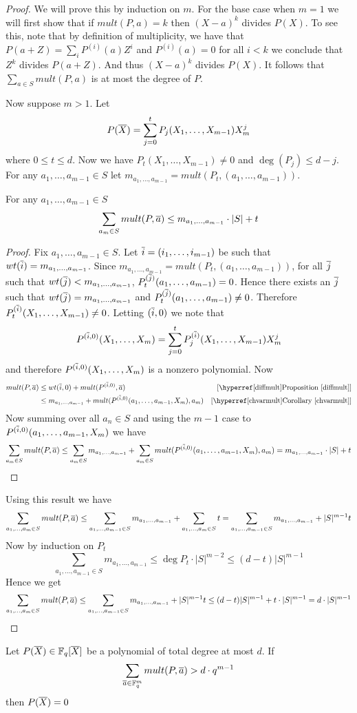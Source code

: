 \begin{proof}
	We will prove this by induction on $m$. For the base case when $m=1$ we will first show that if $mult(P,a)=k$ then $(X-a)^k$ divides $P(X)$. To see this, note that by definition of multiplicity, we have that $P(a+Z)=\sum\limits_{i}P^{(i)}(a)Z^{i}$ and $P^{(i)}(a)=0$ for all $i<k$ we conclude that $Z^k$ divides $P(a+Z)$. And thus $(X-a)^k$ divides $P(X)$. It follows that $\sum\limits_{a\in S} mult(P,a)$ is at most the degree of $P$. 
	
	Now suppose $m>1$. Let $$P(\overline{X})=\sum_{j=0}^t P_j(X_1,\dots, X_{m-1})X^j_m$$where $0\leq t\leq d$. Now we have $P_t(X_1,\dots, X_{m-1})\neq 0$ and $\deg(P_j)\leq d-j$. For any $a_1,\dots, a_{m-1}\in S$ let $m_{a_1,\dots, a_{m-1}}=mult(P_t,(a_1,\dots, a_{m-1}))$. 
	\begin{claim}
		For any $a_1,\dots, a_{m-1}\in S$ $$\sum_{a_m\in S}mult(P, \overline{a})\leq m_{a_1,\dots,a_{m-1}}\cdot |S|+t$$
	\end{claim}
	\begin{proof}
		Fix $a_1,\dots, a_{m-1}\in S$. Let $\overline{i}=(i_1,\dots, i_{m-1})$ be such that $wt(\overline{i})=m_{a_1,\dots,a_{m-1}}$. Since $m_{a_1,\dots, a_{m-1}}=mult(P_t,(a_1,\dots, a_{m-1}))$, for all $\overline{j}$ such that $wt(\overline{j})<m_{a_1,\dots, a_{m-1}}$, $P_t^{(\overline{j})}(a_1,\dots, a_{m-1})=0$. Hence there exists an $\overline{j}$ such that $wt(\overline{j})=m_{a_1,\dots, a_{m-1}}$ and $P_t^{(\overline{j})}(a_1,\dots, a_{m-1})\neq 0$. Therefore  $P_t^{(\overline{i})}(X_1,\dots, X_{m-1})\neq 0$. Letting $(\overline{i},0)$ we note that $$P^{(\overline{i},0)}(X_1,\dots, X_m)=\sum_{j=0}^tP_j^{(\overline{i})}(X_1,\dots, X_{m-1})X_m^j$$and therefore $P^{(\overline{i},0)}(X_1,\dots, X_m)$ is a nonzero polynomial. Now
		\begin{align*}
			mult(P,\ova) & \leq wt(\ovi,0)+mult(P^{(\ovi,0)}, \ova) & [\text{\propref{diffmult}}]\\
			& \leq m_{a_1,\dots, a_{m-1}}+mult(P^{(\ovi,0)}(a_1,\dots, a_{m-1},X_m),a_m) & [\text{\corref{chvarmult}}]
		\end{align*}
		Now summing over all $a_n\in S$ and using the $m-1$ case to $P^{(\overline{i},0)}(a_1,\dots, a_{m-1},X_m)$ we have $$\sum_{a_m\in S}mult(P, \overline{a})\leq \sum_{a_m\in S}m_{a_1,\dots, a_{m-1}}+\sum_{a_m\in S}mult(P^{(\overline{i},0)}(a_1,\dots, a_{m-1},X_m),a_m)= m_{a_1,\dots,a_{m-1}}\cdot |S|+t$$
	\end{proof}
	Using this result we have $$\sum_{a_1,\dots, a_{m}\in S}mult(P,\overline{a})\leq \sum_{a_1,\dots, a_{m-1}\in S}m_{a_1,\dots, a_{m-1}}+\sum_{a_1,\dots, a_{m}\in S} t=\sum_{a_1,\dots, a_{m-1}\in S}m_{a_1,\dots, a_{m-1}}+|S|^{m-1}t$$Now by induction on $P_t$ $$\sum_{a_1,\dots, a_{m-1}\in S}m_{a_1,\dots, a_{m-1}} \leq \deg P_t \cdot |S|^{m-2}\leq (d-t)|S|^{m-1}$$ Hence we get $$\sum_{a_1,\dots, a_{m}\in  S}mult(P,\overline{a})\leq \sum_{a_1,\dots, a_{m-1}\in S}m_{a_1,\dots, a_{m-1}}+|S|^{m-1}t\leq (d-t)|S|^{m-1}+t\cdot |S|^{m-1}=d\cdot |S|^{m-1}$$
\end{proof}
\begin{corollary}
	Let $P(\overline{X})\in \mathbb{F}_q[\overline{X}]$ be a polynomial of total degree at most $d$. If $$\sum_{\overline{a}\in \mathbb{F}_q^m}mult(P,\overline{a})>d\cdot q^{m-1}$$then $P(\overline{X})=0$
\end{corollary}
